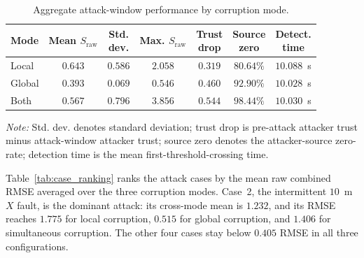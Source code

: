 \documentclass[letterpaper,journal]{IEEEtran}
\begin{document}
\begin{table}[!t]
\centering
\caption{Aggregate attack-window performance by corruption mode.}
\label{tab:attack_mode_rmse_summary}
\footnotesize
\setlength{\tabcolsep}{0pt}
\renewcommand{\arraystretch}{1.22}
\begin{tabular*}{\columnwidth}{@{\extracolsep{\fill}}lcccccc@{}}
\toprule
\textbf{Mode} & \shortstack{\textbf{Mean}\\$S_{\mathrm{raw}}$} & \shortstack{\textbf{Std.}\\\textbf{dev.}} & \shortstack{\textbf{Max.}\\$S_{\mathrm{raw}}$} & \shortstack{\textbf{Trust}\\\textbf{drop}} & \shortstack{\textbf{Source}\\\textbf{zero}} & \shortstack{\textbf{Detect.}\\\textbf{time}} \\
\midrule
Local  & $0.643$ & $0.586$ & $2.058$ & $0.319$ & $80.64\%$ & $10.088$~s \\
Global & $0.393$ & $0.069$ & $0.546$ & $0.460$ & $92.90\%$ & $10.028$~s \\
Both   & $0.567$ & $0.796$ & $3.856$ & $0.544$ & $98.44\%$ & $10.030$~s \\
\bottomrule
\end{tabular*}
\vspace{0.9ex}
\parbox{\columnwidth}{\footnotesize\emph{Note:} Std. dev. denotes standard deviation; trust drop is pre-attack attacker trust minus attack-window attacker trust; source zero denotes the attacker-source zero-rate; detection time is the mean first-threshold-crossing time.}
\end{table}

Table~\ref{tab:case_ranking} ranks the attack cases by the mean raw combined RMSE averaged over the three corruption modes. Case~2, the intermittent $10$~m $X$ fault, is the dominant attack: its cross-mode mean is $1.232$, and its RMSE reaches $1.775$ for local corruption, $0.515$ for global corruption, and $1.406$ for simultaneous corruption. The other four cases stay below $0.405$ RMSE in all three configurations.
\end{document}
